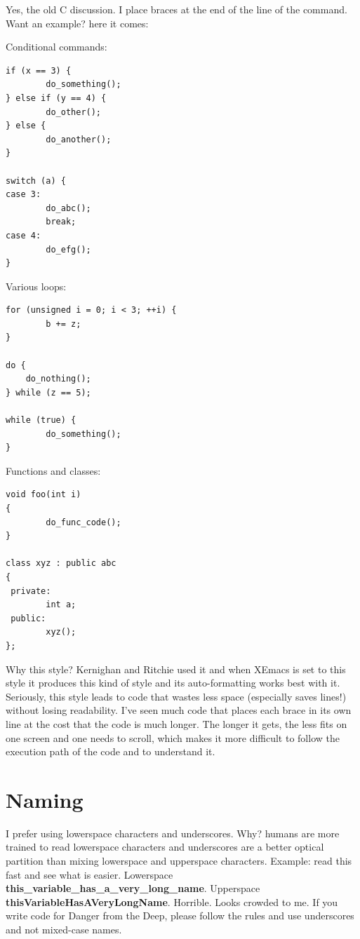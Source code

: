 \documentclass[english,a4paper,12pt]{report}
\newcommand{\dftd}{\textsf{Danger from the Deep}}
\begin{document}
Yes, the old C discussion. I place braces at the end of the line of the
command. Want an example? here it comes:
    
Conditional commands:
    
\begin{verbatim}
if (x == 3) {
        do_something();
} else if (y == 4) {
        do_other();
} else {
        do_another();
}

switch (a) {
case 3:
        do_abc();
        break;
case 4:
        do_efg();
}
\end{verbatim}

    Various loops:
    
    \begin{verbatim}
for (unsigned i = 0; i < 3; ++i) {
        b += z;
}

do {
    do_nothing();
} while (z == 5);

while (true) {
        do_something();
}
\end{verbatim}

    Functions and classes:
    
    \begin{verbatim}
void foo(int i)
{
        do_func_code();
}

class xyz : public abc
{
 private:
        int a;
 public:
        xyz();
};
\end{verbatim}

    Why this style? Kernighan and Ritchie used it and when XEmacs is set
    to this style it produces this kind of style and its auto-formatting
    works best with it. Seriously, this style leads to code that wastes
    less space (especially saves lines!) without losing readability.
    I've seen much code that places each brace in its own line at the
    cost that the code is much longer. The longer it gets, the less fits
    on one screen and one needs to scroll, which makes it more difficult
    to follow the execution path of the code and to understand it.
    

    \section{Naming}

    I prefer using lowerspace characters and underscores. Why? humans
    are more trained to read lowerspace characters and underscores are a
    better optical partition than mixing lowerspace and upperspace
    characters. Example: read this fast and see what is easier.
    Lowerspace \textbf{this\_variable\_has\_a\_very\_long\_name}.
    Upperspace \textbf{thisVariableHasAVeryLongName}. Horrible. Looks
    crowded to me. If you write code for \dftd, please follow the rules
    and use underscores and not mixed-case names.
    
\end{document}
